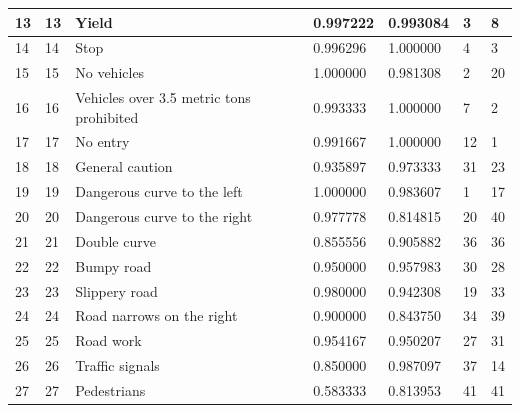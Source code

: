 \documentclass[]{article}
\begin{document}
\begin{table}[]
{\begin{tabular}{lllllll}
			13        & 13          & Yield                                             & 0.997222 & 0.993084        & 3            & 8  \\ \hline
			14        & 14          & Stop                                              & 0.996296 & 1.000000        & 4            & 3  \\ \hline
			15        & 15          & No vehicles                                       & 1.000000 & 0.981308        & 2            & 20 \\ \hline
			16        & 16          & Vehicles over 3.5 metric tons prohibited          & 0.993333 & 1.000000        & 7            & 2  \\ \hline
			17        & 17          & No entry                                          & 0.991667 & 1.000000        & 12           & 1  \\ \hline
			18        & 18          & General caution                                   & 0.935897 & 0.973333        & 31           & 23 \\ \hline
			19        & 19          & Dangerous curve to the left                       & 1.000000 & 0.983607        & 1            & 17 \\ \hline
			20        & 20          & Dangerous curve to the right                      & 0.977778 & 0.814815        & 20           & 40 \\ \hline
			21        & 21          & Double curve                                      & 0.855556 & 0.905882        & 36           & 36 \\ \hline
			22        & 22          & Bumpy road                                        & 0.950000 & 0.957983        & 30           & 28 \\ \hline
			23        & 23          & Slippery road                                     & 0.980000 & 0.942308        & 19           & 33 \\ \hline
			24        & 24          & Road narrows on the right                         & 0.900000 & 0.843750        & 34           & 39 \\ \hline
			25        & 25          & Road work                                         & 0.954167 & 0.950207        & 27           & 31 \\ \hline
			26        & 26          & Traffic signals                                   & 0.850000 & 0.987097        & 37           & 14 \\ \hline
			27        & 27          & Pedestrians                                       & 0.583333 & 0.813953        & 41           & 41 \\ \hline

\end{tabular}}
\end{table}
\end{document}
